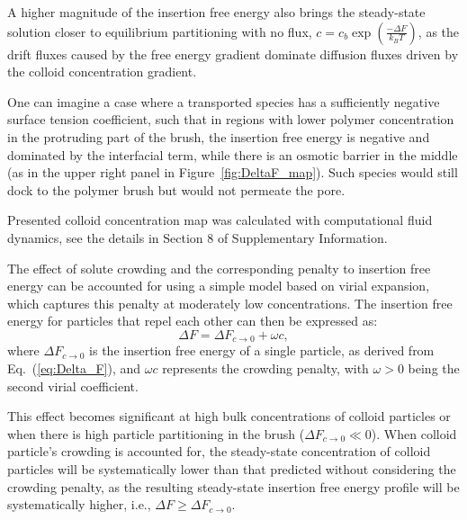 \documentclass[12pt, a4paper]{article}
\newcommand\todo[1]{\textcolor{red}{#1}}
\begin{document}
A higher magnitude of the insertion free energy also brings the steady-state solution closer to equilibrium partitioning with no flux, $c = c_{b} \exp\left( \frac{-\Delta F}{k_B T} \right)$, as the drift fluxes caused by the free energy gradient dominate diffusion fluxes driven by the colloid concentration gradient.

One can imagine a case where a transported species has a sufficiently negative surface tension coefficient, such that in regions with lower polymer concentration in the protruding part of the brush, the insertion free energy is negative and dominated by the interfacial term, while there is an osmotic barrier in the middle (as in the upper right panel in Figure~\ref{fig:DeltaF_map}).
Such species would still dock to the polymer brush but would not permeate the pore.


Presented colloid concentration map was calculated with computational fluid dynamics, see the details in 
Section 8 of Supplementary Information.


The effect of solute crowding and the corresponding penalty to insertion free energy can be accounted for using a simple model based on virial expansion, which captures this penalty at moderately low concentrations.
The insertion free energy for particles that repel each other can then be expressed as:
\begin{equation}
    \Delta F = \Delta F_{c \to 0} + \omega c,
\end{equation}
where $\Delta F_{c \to 0}$ is the insertion free energy of a single particle, as derived from Eq.~(\ref{eq:Delta_F}), and $\omega c$ represents the crowding penalty, with $\omega > 0$ being the second virial coefficient.

This effect becomes significant at high bulk concentrations of colloid particles or when there is high particle partitioning in the brush ($\Delta F_{c \to 0} \ll 0$). 
When colloid particle's crowding is accounted for, the steady-state concentration of colloid particles will be systematically lower than that predicted without considering the crowding penalty, as the resulting steady-state insertion free energy profile will be systematically higher, i.e., $\Delta F \ge \Delta F_{c \to 0}$.
\end{document}
